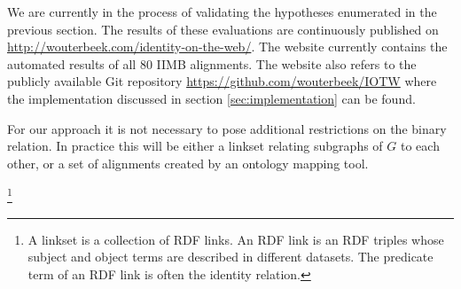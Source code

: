 \documentclass[letterpaper]{article}
\begin{document}
We are currently in the process of validating the hypotheses enumerated in the previous section. The results of these evaluations are continuously published on \url{http://wouterbeek.com/identity-on-the-web/}. The website currently contains the automated results of all 80 IIMB alignments. The website also refers to the publicly available Git repository \url{https://github.com/wouterbeek/IOTW} where the implementation discussed in section \ref{sec:implementation} can be found.

For our approach it is not necessary to pose additional restrictions on the binary relation. In practice this will be either a linkset relating subgraphs of $G$ to each other, or a set of alignments created by an ontology mapping tool.

\footnote{A linkset is a collection of RDF links. An RDF link is an RDF triples whose subject and object terms are described in different datasets. \cite{void_2011} The predicate term of an RDF link is often the identity relation.}



\end{document}
